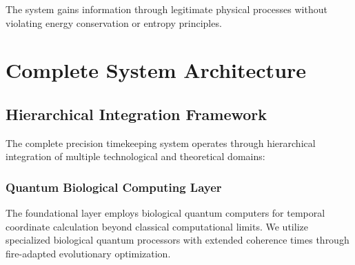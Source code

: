 \documentclass[12pt,a4paper]{article}
\begin{document}
The system gains information through legitimate physical processes without violating energy conservation or entropy principles.

\section{Complete System Architecture}

\subsection{Hierarchical Integration Framework}

The complete precision timekeeping system operates through hierarchical integration of multiple technological and theoretical domains:

\subsubsection{Quantum Biological Computing Layer}

The foundational layer employs biological quantum computers for temporal coordinate calculation beyond classical computational limits. We utilize specialized biological quantum processors with extended coherence times through fire-adapted evolutionary optimization.
\end{document}
